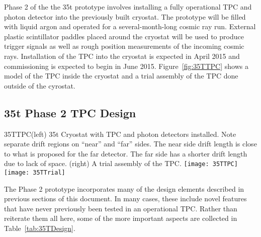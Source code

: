 Phase 2 of the the 35t prototype involves installing a fully operational TPC and photon detector into 
the previously built cryostat.
The prototype will be filled with liquid argon and operated for a several-month-long cosmic ray run. 
External plastic scintillator paddles placed around the cryostat will be used to produce
trigger signals as well as rough position measurements of the incoming cosmic rays.
Installation of the TPC into the cryostat is expected in April 2015 and 
commissioning is expected to begin in June 2015.
Figure~\ref{fig:35TTPC} shows a model of the TPC inside the cryostat and a trial assembly of
the TPC done outside of the cyrostat. 

\subsection{35t Phase 2 TPC Design}

\begin{cdrfigure}{35TTPC}{(left) 35t Cryostat with TPC and photon detectors installed. 
Note separate drift regions on ``near'' and ``far'' sides.
The near side drift length is close to what is proposed for the far detector. The far
side has a shorter drift length due to lack of space.
(right) A trial assembly of the TPC.
}
\texttt{[image: 35TTPC]}  
\texttt{[image: 35TTrial]}  
\end{cdrfigure}

The Phase 2 prototype incorporates many of the design elements described in previous
sections of this document.
In many cases, these include novel features that have never previously been tested
in an operational TPC.
Rather than reiterate them all here, some of the more important
aspects are collected in Table~\ref{tab:35TDesign}.

